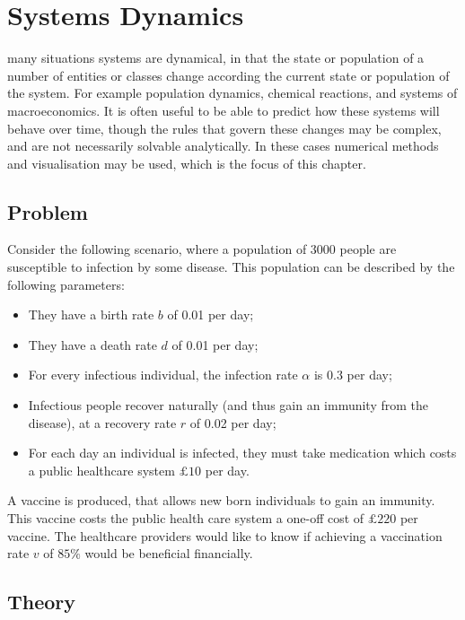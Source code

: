 \chapter[Systems dynamics]{Systems Dynamics}\label{chp:system_dynamics}

 many situations systems are dynamical, in that the state
or population of a number of entities or classes change according the current
state or population of the system. For example population dynamics, chemical
reactions, and systems of macroeconomics. It is often useful to be able to
predict how these systems will behave over time, though the rules that govern
these changes may be complex, and are not necessarily solvable analytically. In
these cases numerical methods and visualisation may be used, which is the focus
of this chapter.

\section{Problem}\label{sec:system_dynamics_problem}
Consider the following scenario, where a population of 3000 people are
susceptible to infection by some disease. This population can be described by
the following parameters:

\begin{itemize}
  \item They have a birth rate $b$ of 0.01 per day;
  \item They have a death rate $d$ of 0.01 per day;
  \item For every infectious individual, the infection rate $\alpha$ is 0.3 per
  day;
  \item Infectious people recover naturally (and thus gain an immunity from the
  disease), at a recovery rate $r$ of 0.02 per day;
  \item For each day an individual is infected, they must take medication which
  costs a public healthcare system $\pounds 10$ per day.
\end{itemize}

A vaccine is produced, that allows new born individuals to gain an immunity.
This vaccine costs the public health care system a one-off cost of
$\pounds 220$ per vaccine. The healthcare providers would like to know if
achieving a vaccination rate $v$ of $85\%$ would be beneficial financially.

\section{Theory}\label{sec:system_dynamics_theory}

